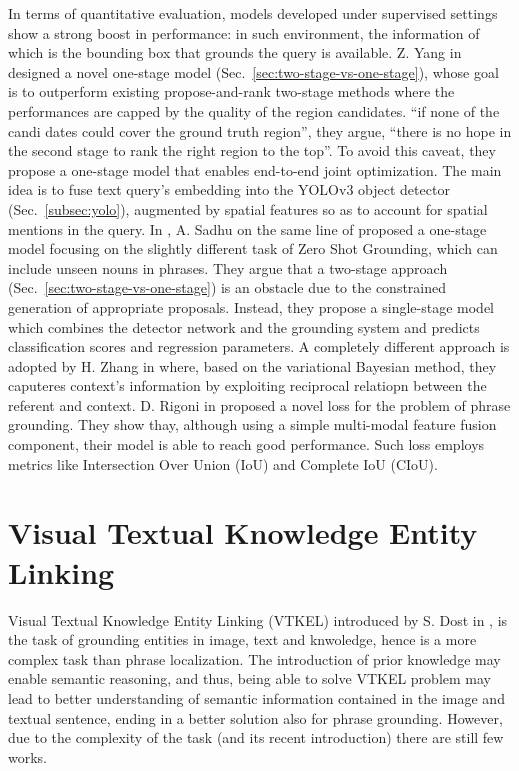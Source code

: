 In terms of quantitative evaluation, models developed under supervised
settings show a strong boost in performance: in such environment, the
information of which is the bounding box that grounds the query is
available. Z. Yang \etal{} in \cite{yang2019fast} designed a novel
one-stage model (Sec.~\ref{sec:two-stage-vs-one-stage}), whose goal is
to outperform existing propose-and-rank two-stage methods where the
performances are capped by the quality of the region candidates. ``if
none of the candi dates could cover the ground truth region'', they
argue, ``there is no hope in the second stage to rank the right region
to the top''. To avoid this caveat, they propose a one-stage model
that enables end-to-end joint optimization. The main idea is to fuse
text query's embedding into the YOLOv3 object detector
(Sec.~\ref{subsec:yolo}), augmented by spatial features so as to
account for spatial mentions in the query. In \cite{sadhu2019zero}, A.
Sadhu \etal{} on the same line of \cite{yang2019fast} proposed a
one-stage model focusing on the slightly different task of Zero Shot
Grounding, which can include unseen nouns in phrases. They argue that
a two-stage approach (Sec.~\ref{sec:two-stage-vs-one-stage}) is an
obstacle due to the constrained generation of appropriate proposals.
Instead, they propose a single-stage model which combines the detector
network and the grounding system and predicts classification scores
and regression parameters. A completely different approach is adopted
by H. Zhang \etal{} in \cite{zhang2018grounding} where, based on the
variational Bayesian method, they caputeres context's information by
exploiting reciprocal relatiopn between the referent and context. D.
Rigoni \etal{} in \cite{rigoni2021better} proposed a novel loss for
the problem of phrase grounding. They show thay, although using a
simple multi-modal feature fusion component, their model is able to
reach good performance. Such loss employs metrics like Intersection
Over Union (IoU) and Complete IoU (CIoU).

\section{Visual Textual Knowledge Entity Linking}

Visual Textual Knowledge Entity Linking (VTKEL) introduced by S. Dost
\etal{} in \cite{dost2020jointly, dost2020vtkel, dost2020visual}, is
the task of grounding entities in image, text and knwoledge, hence is
a more complex task than phrase localization. The introduction of
prior knowledge may enable semantic reasoning, and thus, being able to
solve VTKEL problem may lead to better understanding of semantic
information contained in the image and textual sentence, ending in a
better solution also for phrase grounding. However, due to the
complexity of the task (and its recent introduction) there are still
few works. 

